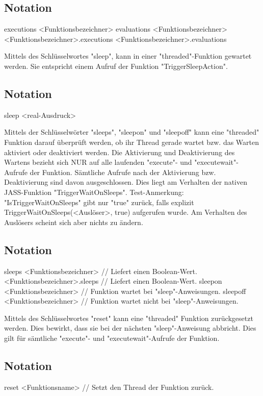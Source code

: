 \subsection{Notation}
executions <Funktionsbezeichner>
evaluations <Funktionsbezeichner>
<Funktionsbezeichner>.executions
<Funktionsbezeichner>.evaluations

Mittels des Schlüsselwortes "sleep", kann in einer "threaded"-Funktion gewartet werden.
Sie entspricht einem Aufruf der Funktion "TriggerSleepAction".

\subsection{Notation}
sleep <real-Ausdruck>

Mittels der Schlüsselwörter "sleeps", "sleepon" und "sleepoff" kann eine "threaded" Funktion darauf überprüft werden, ob ihr Thread gerade wartet bzw.
das Warten aktiviert oder deaktiviert werden.
Die Aktivierung und Deaktivierung des Wartens bezieht sich NUR auf alle laufenden "execute"- und "executewait"-Aufrufe der Funktion.
Sämtliche Aufrufe nach der Aktivierung bzw. Deaktivierung sind davon ausgeschlossen.
Dies liegt am Verhalten der nativen JASS-Funktion "TriggerWaitOnSleeps".
Test-Anmerkung:
"IsTriggerWaitOnSleeps" gibt nur "true" zurück, falls explizit TriggerWaitOnSleeps(<Auslöser>, true) aufgerufen wurde. Am Verhalten des Auslösers
scheint sich aber nichts zu ändern.

\subsection{Notation}
sleeps <Funktionsbezeichner> // Liefert einen Boolean-Wert.
<Funktionsbezeichner>.sleeps // Liefert einen Boolean-Wert.
sleepon <Funktionsbezeichner> // Funktion wartet bei "sleep"-Anweisungen.
sleepoff <Funktionsbezeichner> // Funktion wartet nicht bei "sleep"-Anweisungen.

Mittels des Schlüsselwortes "reset" kann eine "threaded" Funktion zurückgesetzt werden. Dies bewirkt, dass sie bei der nächsten "sleep"-Anweisung
abbricht. Dies gilt für sämtliche "execute"- und "executewait"-Aufrufe der Funktion.

\subsection{Notation}
reset <Funktionsname> // Setzt den Thread der Funktion zurück.

